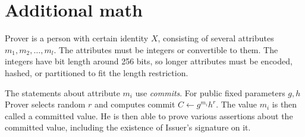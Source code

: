 \documentclass[a4paper]{article}
\begin{document}
\appendix 

\section{Additional math}\label{sec:detail}

 Prover  is a person with certain identity $X$, consisting of several attributes $m_1,m_2,\ldots, m_l$. The attributes must be integers or convertible to them. The integers have bit length around 256 bits, so longer attributes must be encoded, hashed, or partitioned to fit the length restriction.
 
 The statements about attribute $m_i$ use \emph{commits}. For public fixed parameters $g,h$
 Prover selects random $r$ and computes commit $C\leftarrow  g^{m_i}h^r$. The value $m_i$ is then called a committed value. He is then able to prove various assertions about the committed value, including the existence of Issuer's signature on it.
 
 
 
\end{document}
